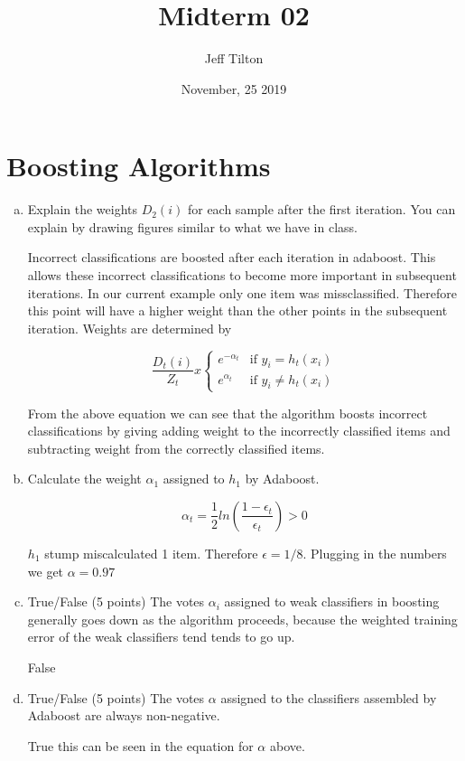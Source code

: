 \documentclass[a4paper]{article}
\title{Midterm 02}
\author{Jeff Tilton}
\date{November, 25 2019}
\begin{document}
\maketitle

\section{Boosting Algorithms}
\begin{enumerate}[(a)]
\item Explain the weights $D_2(i)$ for each sample after the first iteration. You can explain by drawing figures similar to what we have in class.

Incorrect classifications are boosted after each iteration in adaboost.  This allows these incorrect classifications to become more important in subsequent iterations.  In our current example only one item was missclassified.  Therefore this point will have a higher weight than the other points in the subsequent iteration.  Weights are determined by 

$$\frac{D_t(i)}{Z_t}x 
\begin{cases}  e^{-\alpha_t} & \text{if } y_i=h_t(x_i) \\
			   e^{\alpha_t} & \text{if } y_i \neq h_t(x_i)
\end{cases}
$$

From the above equation we can see that the algorithm boosts incorrect classifications by giving adding weight to the incorrectly classified items and subtracting weight from the correctly classified items.



\item Calculate the weight $\alpha_1$ assigned to $h_1$ by Adaboost.

$$
\alpha_t = \frac{1}{2} ln \left( \frac{1-\epsilon_t}{\epsilon_t} \right) >0
$$

$h_1$ stump miscalculated 1 item.  Therefore $\epsilon = 1/8$.  Plugging in the numbers we get $\alpha = 0.97$

\item True/False (5 points) The votes $\alpha_i$ assigned to weak classifiers in boosting generally goes down as the algorithm proceeds, because the weighted training error of the weak classifiers tend tends to go up.

False

\item True/False (5 points) The votes $\alpha$ assigned to the classifiers assembled by Adaboost are always non-negative.

True this can be seen in the equation for $\alpha$ above.

\end{enumerate}
\end{document}

